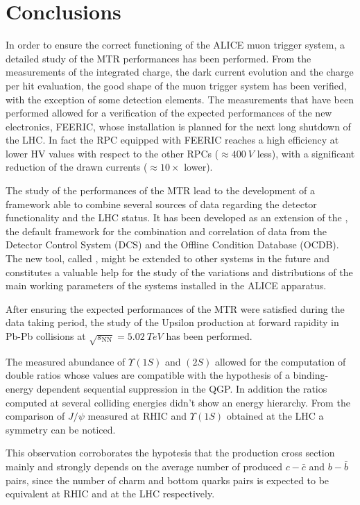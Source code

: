 \chapter{Conclusions}

In order to ensure the correct functioning of the ALICE muon trigger system, a detailed study of the MTR performances has been performed.
From the measurements of the integrated charge, the dark current evolution and the charge per hit evaluation, the good shape of the muon trigger system has been verified, with the exception of some detection elements.
The measurements that have been performed allowed for a verification of the expected performances of the new electronics, FEERIC, whose installation is planned for the next long shutdown of the LHC.
In fact the RPC equipped with FEERIC reaches a high efficiency at lower HV values with respect to the other RPCs ($\approx400\ V$ less), with a significant reduction of the drawn currents ($\approx10\times$ lower).

The study of the performances of the MTR lead to the development of a framework able to combine several sources of data regarding the detector functionality and the LHC status.
It has been developed as an extension of the  , the default framework for the combination and correlation of data from the Detector Control System (DCS) and the Offline Condition Database (OCDB).
The new tool, called , might be extended to other systems in the future and constitutes a valuable help for the study of the variations and distributions of the main working parameters of the systems installed in the ALICE apparatus.


After ensuring the expected performances of the MTR were satisfied during the data taking period, the study of the Upsilon production at forward rapidity in Pb-Pb collisions at $\sqrt{s_{\mathrm{NN}}}=5.02\ TeV$ has been performed.

The measured abundance of $\Upsilon(1S)$ and $(2S)$ allowed for the computation of double ratios whose values are compatible with the hypothesis of a binding-energy dependent sequential suppression in the QGP.
In addition the ratios computed at several colliding energies didn't show an energy hierarchy.
From the comparison of $J/\psi$ measured at RHIC and $\Upsilon(1S)$ obtained at the LHC a symmetry can be noticed.

This observation corroborates the hypotesis that the production cross section mainly and strongly depends on the average number of produced $c-\bar{c}$ and $b-\bar{b}$ pairs, since the number of charm and bottom quarks pairs is expected to be equivalent at RHIC and at the LHC respectively.

